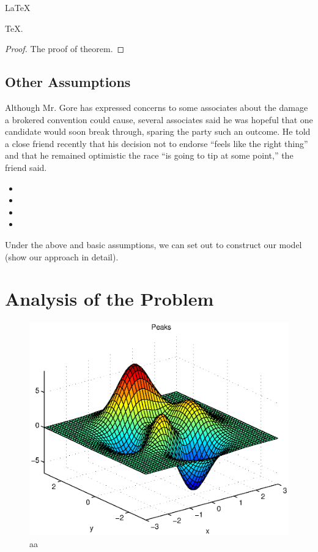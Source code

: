     \begin{Theorem} \label{thm:latex}
    \LaTeX
    \end{Theorem}
    \begin{Lemma} \label{thm:tex}
    \TeX .
    \end{Lemma}
    \begin{proof}
    The proof of theorem.
    \end{proof}






\subsection{Other Assumptions}
Although Mr. Gore has expressed concerns to some associates about
the damage a brokered convention could cause, several associates
said he was hopeful that one candidate would soon break through,
sparing the party such an outcome. He told a close friend recently
that his decision not to endorse “feels like the right thing”
and that he remained optimistic the race “is going to tip at some
point,” the friend said.
\begin{itemize}
\item
\item
\item
\item
\end{itemize}

 Under the above and basic assumptions, we can set out
to construct our model (show our approach in detail).
\section{Analysis of the Problem }
\begin{figure}
\small
\centering
\includegraphics[width=12cm]{./picture/aaa.eps}
\caption{aa} \label{fig:aa}
\end{figure}

